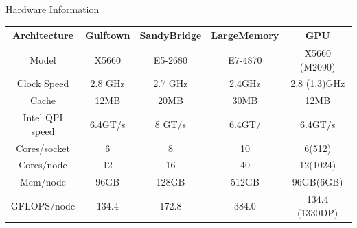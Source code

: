 \documentclass[final,t]{beamer}
\begin{document}
\begin{frame}[fragile]{}
\begin{columns}[t]
\begin{column}{.32\linewidth}
      \begin{block}{Hardware Information}
        \vspace*{-2ex}
      \begin{center}
      \begin{tabular}{|c|c|c|c|c|}
      \hline 
      \textbf{Architecture} & \textbf{Gulftown} & \textbf{SandyBridge} & \textbf{LargeMemory} & \textbf{GPU} \\ 
      \hline 
      Model & X5660 & E5-2680 & E7-4870 & X5660 (M2090) \\ 
      \hline 
      Clock Speed & 2.8 GHz & 2.7 GHz & 2.4GHz & 2.8 (1.3)GHz\\ 
      \hline 
      Cache & 12MB & 20MB & 30MB & 12MB\\ 
      \hline 
      Intel QPI speed & 6.4GT/s & 8 GT/s & 6.4GT/ & 6.4GT/s\\ 
      \hline 
      Cores/socket & 6 & 8 & 10 & 6(512)\\ 
      \hline       
      Cores/node & 12 & 16 & 40 & 12(1024)\\ 
      \hline 
      Mem/node & 96GB & 128GB & 512GB & 96GB(6GB)\\ 
      \hline 
      GFLOPS/node & 134.4 & 172.8 & 384.0 & 134.4 (1330DP)\\ 
      \hline 
      \end{tabular} 
      \end{center}
        \vspace*{-2ex}
      \end{block}



\end{column}
\end{columns}
\end{frame}
\end{document}
